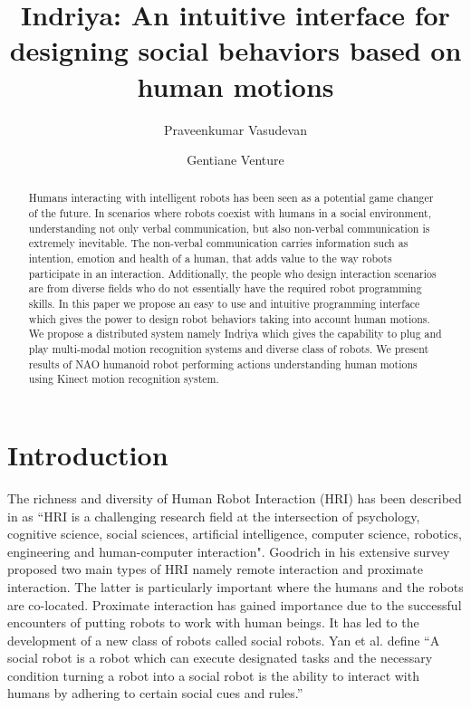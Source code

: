 \documentclass{llncs}
\title{Indriya: An intuitive interface for designing social behaviors based on human motions}
\author{Praveenkumar Vasudevan\inst{1} \and Gentiane Venture\inst{2}}
\institute{\'{E}cole Centrale de Nantes, France,\\
\email{praveenv4k@gmail.com}
\and
Tokyo University of Agriculture and Technology, Japan\\
\email{venture@cc.tuat.ac.jp}}
\begin{document}
\maketitle   
\begin{abstract}
	Humans interacting with intelligent robots has been seen as a potential game changer of the future. In scenarios where robots coexist with humans in a social environment, understanding not only verbal communication, but also non-verbal communication is extremely inevitable. The non-verbal communication carries information such as intention, emotion and health of a human, that adds value to the way robots participate in an interaction. Additionally, the people who design interaction scenarios are from diverse fields who do not essentially have the required robot programming skills. In this paper we propose an easy to use and intuitive programming interface which gives the power to design robot behaviors taking into account human motions. We propose a distributed system namely Indriya which gives the capability to plug and play multi-modal motion recognition systems and diverse class of robots. We present results of NAO humanoid robot performing actions understanding human motions using Kinect motion recognition system.
\end{abstract}
\section{Introduction}
\quad The richness and diversity of Human Robot Interaction (HRI) has been described in \cite{dautenhahn2007methodology} as ``HRI is a challenging research field at the intersection of psychology, cognitive science, social sciences, artificial intelligence, computer science, robotics, engineering and human-computer interaction". Goodrich in his extensive survey \cite{goodrich2007human} proposed two main types of HRI namely remote interaction and proximate interaction. The latter is particularly important where the humans and the robots are co-located. Proximate interaction has gained importance due to the successful encounters of putting robots to work with human beings. It has led to the development of a new class of robots called social robots. Yan et al. \cite{yan2014survey} define ``A social robot is a robot which can execute designated tasks and the necessary condition turning a robot into a social robot is the ability to interact with humans by adhering to certain social cues and rules.''
\end{document}
